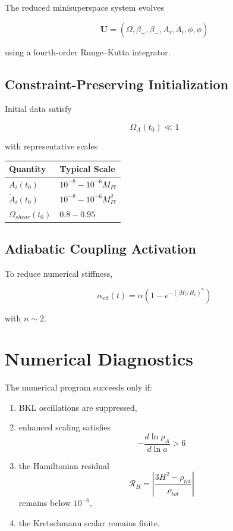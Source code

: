 \documentclass[11pt]{article}
\begin{document}
The reduced minisuperspace system evolves

\[
\mathbf U
=
(\Omega,\beta_+,\beta_-,A_i,\dot A_i,\phi,\dot\phi)
\]

using a fourth-order Runge--Kutta integrator.

\subsection{Constraint-Preserving Initialization}

Initial data satisfy

\[
\Omega_A(t_0) \ll 1
\]

with representative scales

\begin{center}
\begin{tabular}{ll}
\toprule
Quantity & Typical Scale \\
\midrule
$A_i(t_0)$ & $10^{-8} - 10^{-6} M_{Pl}$ \\
$\dot A_i(t_0)$ & $10^{-8} - 10^{-6} M_{Pl}^2$ \\
$\Omega_{shear}(t_0)$ & $0.8 - 0.95$ \\
\bottomrule
\end{tabular}
\end{center}

\subsection{Adiabatic Coupling Activation}

To reduce numerical stiffness,

\[
\alpha_{\mathrm{eff}}(t)
=
\alpha
\left(
1-e^{-(|H|/H_c)^n}
\right)
\]

with \(n \sim 2\).

\section{Numerical Diagnostics}

The numerical program succeeds only if:

\begin{enumerate}
\item BKL oscillations are suppressed,
\item enhanced scaling satisfies
\[
-\frac{d\ln\rho_A}{d\ln a} > 6
\]
\item the Hamiltonian residual
\[
\mathcal R_H
=
\left|
\frac{3H^2-\rho_{tot}}{\rho_{tot}}
\right|
\]
remains below \(10^{-6}\),
\item the Kretschmann scalar remains finite.
\end{enumerate}
\end{document}
